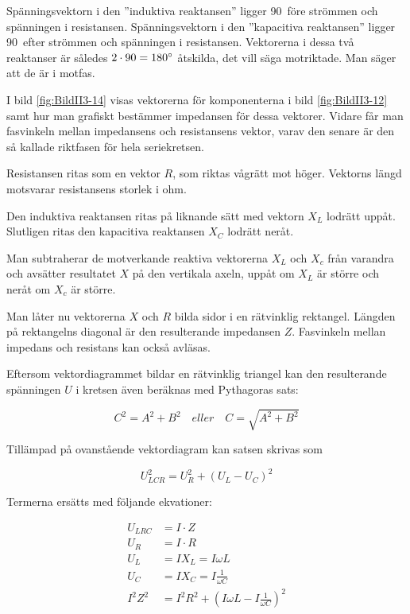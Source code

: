 Spänningsvektorn i den ''induktiva reaktansen'' ligger 90\degree~före strömmen
och spänningen i resistansen.
Spänningsvektorn i den ''kapacitiva reaktansen'' ligger 90\degree~efter
strömmen och spänningen i resistansen.
Vektorerna i dessa två reaktanser är således \(2 \cdot 90 = 180\degree\)
åtskilda, det vill säga motriktade.
Man säger att de är i motfas.


I bild \ref{fig:BildII3-14} visas vektorerna för komponenterna i bild
\ref{fig:BildII3-12} samt hur man grafiskt bestämmer impedansen för dessa
vektorer.
Vidare får man fasvinkeln mellan impedansens och resistansens vektor, varav den
senare är den så kallade riktfasen för hela seriekretsen.

Resistansen ritas som en vektor \(R\), som riktas vågrätt mot höger.
Vektorns längd motsvarar resistansens storlek i ohm.

Den induktiva reaktansen ritas på liknande sätt med vektorn \(X_L\) lodrätt
uppåt.
Slutligen ritas den kapacitiva reaktansen \(X_C\) lodrätt neråt.

Man subtraherar de motverkande reaktiva vektorerna \(X_L\) och \(X_c\) från
varandra och avsätter resultatet \(X\) på den vertikala axeln, uppåt om \(X_L\)
är större och neråt om \(X_c\) är större.

Man låter nu vektorerna \(X\) och \(R\) bilda sidor i en rätvinklig rektangel.
Längden på rektangelns diagonal är den resulterande impedansen \(Z\).
Fasvinkeln mellan impedans och resistans kan också avläsas.

Eftersom vektordiagrammet bildar en rätvinklig triangel kan den resulterande
spänningen \(U\) i kretsen även beräknas med Pythagoras sats:

\[C^2 = A^2 + B^2 \quad eller \quad C = \sqrt{A^2 + B^2}\]

Tillämpad på ovanstående vektordiagram kan satsen skrivas som

\[U_{LCR}^2 = U_R^2 + ( U_L - U_C)^2\]

Termerna ersätts med följande ekvationer:

\begin{align*}
  U_{LRC} &= I \cdot Z \\
  U_R &= I \cdot R \\
  U_L &= I X_L = I \omega L \\
  U_C &= I X_C = I \frac{1}{\omega C} \\
  I^2 Z^2 &= I^2 R^2 + ( I \omega L - I\frac{1}{\omega C})^2
\end{align*}

